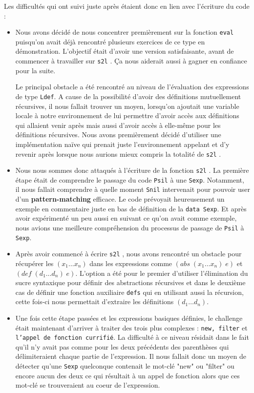 \documentclass[11pt]{article}
\newcommand{\eval}{\texttt{eval} }
\newcommand{\stol}{\texttt{s2l} }
\begin{document}
Les difficultés qui ont suivi juste après étaient donc en lien avec l'écriture du code :
\begin{itemize}
	\item Nous avons décidé de nous concentrer premièrement sur la fonction \eval puisqu'on avait déjà rencontré plusieurs exercices de ce type en démonstration. L'objectif était d'avoir une version satisfaisante, avant de commencer à travailler sur \stol. Ça nous aiderait aussi à gagner en confiance pour la suite. 
	
	Le principal obstacle a été rencontré au niveau de l'évaluation des expressions de type \texttt{Ldef}. A cause de la possibilité d'avoir des définitions mutuellement récursives, il nous fallait trouver un moyen, lorsqu'on ajoutait une variable locale à notre environnement de lui permettre d'avoir accès aux définitions qui allaient venir après mais aussi d'avoir accès à elle-même pour les définitions récursives. Nous avons premièrement décidé d'utiliser une implémentation naïve qui prenait juste l'environnement appelant et d'y revenir après lorsque nous aurions mieux compris la totalité de \stol.
	
	\item Nous nous sommes donc attaqués à l'écriture de la fonction \stol. La première étape était de comprendre le passage du code \texttt{Psil} à une \texttt{Sexp}. Notamment, il nous fallait comprendre à quelle moment \texttt{Snil} intervenait pour pouvoir user d'un \textbf{pattern-matching} efficace. Le code prévoyait heureusement un exemple en commentaire juste en bas de définition de la \texttt{data Sexp}. Et après avoir expérimenté un peu aussi en suivant ce qu'on avait comme exemple, nous avions une meilleure compréhension du processus de passage de \texttt{Psil} à \texttt{Sexp}.
	
	\pagebreak
	
	\item Après avoir commencé à écrire \stol, nous avons rencontré un obstacle pour récupérer les $(x_1 \ldots x_n)$ dans les expressions comme $(abs \; (x_1 \ldots x_n) \; e)$ et $(def \; (d_1 \ldots d_n) \; e)$. L'option a été pour le premier d'utiliser l'élimination du sucre syntaxique pour définir des abstractions récursives et dans le deuxième cas de définir une fonction auxiliaire \texttt{defs} qui en utilisant aussi la récursion, cette fois-ci nous permettait d'extraire les définitions $(d_1 \ldots d_n)$.
	
	\item Une fois cette étape passées et les expressions basiques définies, le challenge était maintenant d'arriver à traiter des trois plus complexes : \texttt{new, filter} et \texttt{l'appel de fonction currifié}. La difficulté à ce niveau résidait dans le fait qu'il n'y avait pas comme pour les deux précédents des parenthèses qui délimiteraient chaque partie de l'expression. Il nous fallait donc un moyen de détecter qu'une \texttt{Sexp} quelconque contenait le mot-clé "new" ou "filter" ou encore aucun des deux ce qui résultait à un appel de fonction alors que ces mot-clé se trouveraient au coeur de l'expression. 
	

\end{itemize}
\end{document}
